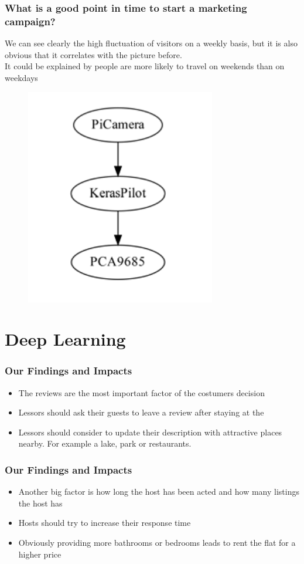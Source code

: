 \documentclass{beamer}
\begin{document}
\begin{frame}
\frametitle{What is a good point in time to start a marketing campaign?}
We can see clearly the high fluctuation of visitors on a weekly basis, but it is also obvious that it correlates with the picture before.\\It could be explained by people are more likely to travel on weekends than on weekdays
\begin{figure}
\includegraphics[width=0.8\linewidth]{photo/autonom}
\end{figure}
\end{frame}
\section{Deep Learning}
\begin{frame}
\frametitle{Our Findings and Impacts}
\begin{itemize}
\item The reviews are the most important factor of the costumers decision
\item Lessors should ask their guests to leave a review after staying at the 
\item Lessors should consider to update their description with attractive places nearby. For example a lake, park or restaurants.
\end{itemize}
\end{frame}
\begin{frame}
\frametitle{Our Findings and Impacts}
\begin{itemize}
\item Another big factor is how long the host has been acted and how many listings the host has
\item Hosts should try to increase their response time
\item Obviously providing more bathrooms or bedrooms leads to rent the flat for a higher price
\end{itemize}
\end{frame}
\end{document}
